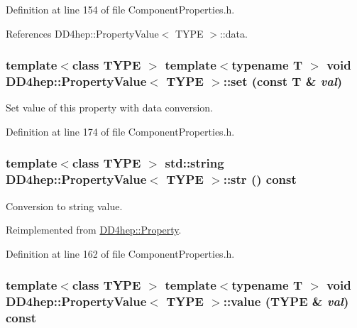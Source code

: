 Definition at line 154 of file ComponentProperties.h.

References DD4hep::PropertyValue$<$ TYPE $>$::data.\hypertarget{class_d_d4hep_1_1_property_value_aff3084db0cda114788abc5788bb0d4c3}{
\subsubsection[{set}]{\setlength{\rightskip}{0pt plus 5cm}template$<$class TYPE $>$ template$<$typename T $>$ void {\bf DD4hep::PropertyValue}$<$ TYPE $>$::set (const {\bf T} \& {\em val})}}
\label{class_d_d4hep_1_1_property_value_aff3084db0cda114788abc5788bb0d4c3}


Set value of this property with data conversion. 

Definition at line 174 of file ComponentProperties.h.\hypertarget{class_d_d4hep_1_1_property_value_aee9a0afd8a49155741da905fdadbbc91}{
\subsubsection[{str}]{\setlength{\rightskip}{0pt plus 5cm}template$<$class TYPE $>$ std::string {\bf DD4hep::PropertyValue}$<$ TYPE $>$::str () const}}
\label{class_d_d4hep_1_1_property_value_aee9a0afd8a49155741da905fdadbbc91}


Conversion to string value. 

Reimplemented from \hyperlink{class_d_d4hep_1_1_property_aed04b1176882fe335eb03a2044bc1cf2}{DD4hep::Property}.

Definition at line 162 of file ComponentProperties.h.\hypertarget{class_d_d4hep_1_1_property_value_a6d455c08f342459a3f372279c4b9ce09}{
\subsubsection[{value}]{\setlength{\rightskip}{0pt plus 5cm}template$<$class TYPE $>$ template$<$typename T $>$ void {\bf DD4hep::PropertyValue}$<$ TYPE $>$::value (TYPE \& {\em val}) const}}
\label{class_d_d4hep_1_1_property_value_a6d455c08f342459a3f372279c4b9ce09}


